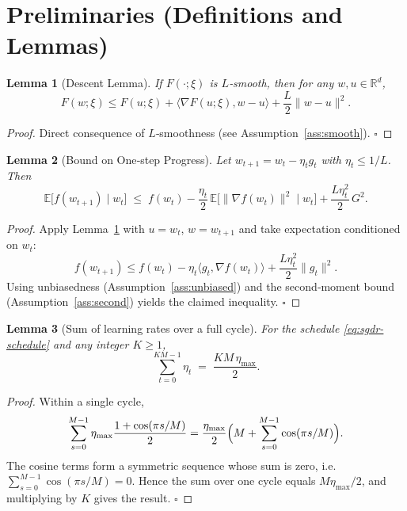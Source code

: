 \documentclass{article}
\newtheorem{lemma}{Lemma}
\newcommand{\E}{\mathbb{E}}
\newcommand{\R}{\mathbb{R}}
\begin{document}
\section*{Preliminaries (Definitions and Lemmas)}
\begin{lemma}[Descent Lemma]\label{lem:descent}
If $F(\cdot;\xi)$ is $L$‑smooth, then for any $w,u\in\R^d$,
\[
F(w;\xi) \le F(u;\xi) + \langle\nabla F(u;\xi),w-u\rangle+\frac{L}{2}\|w-u\|^2 .
\]
\end{lemma}
\begin{proof}
Direct consequence of $L$‑smoothness (see Assumption~\ref{ass:smooth}). \hfill $\square$
\end{proof}

\begin{lemma}[Bound on One‑step Progress]\label{lem:one-step}
Let $w_{t+1}=w_t-\eta_t g_t$ with $\eta_t\le 1/L$. Then
\[
\E\!\bigl[f(w_{t+1})\mid w_t\bigr]
\;\le\;
f(w_t)-\frac{\eta_t}{2}\,\E\!\bigl[\|\nabla f(w_t)\|^2\mid w_t\bigr]
+\frac{L\eta_t^2}{2}\,G^2 .
\]
\end{lemma}
\begin{proof}
Apply Lemma~\ref{lem:descent} with $u=w_t$, $w=w_{t+1}$ and take expectation conditioned on $w_t$:
\[
f(w_{t+1}) \le f(w_t)-\eta_t\langle g_t,\nabla f(w_t)\rangle+\frac{L\eta_t^2}{2}\|g_t\|^2 .
\]
Using unbiasedness (Assumption~\ref{ass:unbiased}) and the second‑moment bound (Assumption~\ref{ass:second}) yields the claimed inequality. \hfill $\square$
\end{proof}

\begin{lemma}[Sum of learning rates over a full cycle]\label{lem:eta-sum}
For the schedule \eqref{eq:sgdr-schedule} and any integer $K\ge1$,
\[
\sum_{t=0}^{KM-1}\eta_t \;=\; \frac{KM\,\eta_{\max}}{2}.
\]
\end{lemma}
\begin{proof}
Within a single cycle,
\[
\sum_{s=0}^{M-1}\eta_{\max}\frac{1+\cos(\pi s/M)}{2}
= \frac{\eta_{\max}}{2}\Bigl(M+\sum_{s=0}^{M-1}\cos(\pi s/M)\Bigr).
\]
The cosine terms form a symmetric sequence whose sum is zero, i.e.
$\sum_{s=0}^{M-1}\cos(\pi s/M)=0$. Hence the sum over one cycle equals $M\eta_{\max}/2$,
and multiplying by $K$ gives the result. \hfill $\square$
\end{proof}
\end{document}
